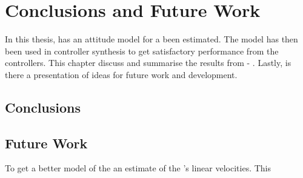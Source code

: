 \chapter{Conclusions and Future Work}\label{cha:conclusions}
In this thesis, has an attitude model for a \abbrROV been estimated. The model has then been used in controller synthesis to get satisfactory performance from the controllers. This chapter discuss and summarise the results from  - . 
Lastly, is there a presentation of ideas for future work and development.

\section{Conclusions}

\section{Future Work}
To get a better model of the \abbrROV an estimate of the \abbrROV's linear velocities. This 
